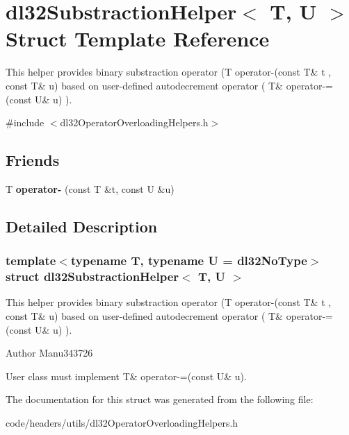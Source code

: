 \hypertarget{structdl32_substraction_helper}{\section{dl32\-Substraction\-Helper$<$ T, U $>$ Struct Template Reference}
\label{structdl32_substraction_helper}
}


This helper provides binary substraction operator (T operator-\/(const T\& t , const T\& u) based on user-\/defined autodecrement operator ( T\& operator-\/=(const U\& u) ).  




{\ttfamily \#include $<$dl32\-Operator\-Overloading\-Helpers.\-h$>$}

\subsection*{Friends}
\begin{DoxyCompactItemize}
\item 
\hypertarget{structdl32_substraction_helper_aa2aa49a1ae1d388eacfef2c9b0e5d27d}{T {\bfseries operator-\/} (const T \&t, const U \&u)}\label{structdl32_substraction_helper_aa2aa49a1ae1d388eacfef2c9b0e5d27d}

\end{DoxyCompactItemize}


\subsection{Detailed Description}
\subsubsection*{template$<$typename T, typename U = dl32\-No\-Type$>$struct dl32\-Substraction\-Helper$<$ T, U $>$}

This helper provides binary substraction operator (T operator-\/(const T\& t , const T\& u) based on user-\/defined autodecrement operator ( T\& operator-\/=(const U\& u) ). 

\begin{DoxyAuthor}{Author}
Manu343726
\end{DoxyAuthor}
User class must implement T\& operator-\/=(const U\& u). 

The documentation for this struct was generated from the following file\-:\begin{DoxyCompactItemize}
\item 
code/headers/utils/dl32\-Operator\-Overloading\-Helpers.\-h\end{DoxyCompactItemize}
